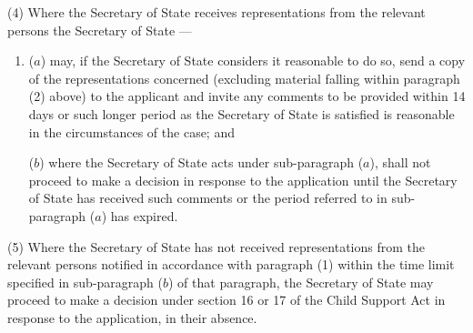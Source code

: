\documentclass[12pt,a4paper]{article}
\begin{document}
(4) Where the 
Secretary of State  %
receives representations from the relevant persons 
the Secretary of State%
—
\begin{enumerate}\item[]
($a$) may, if 
the Secretary of State  %
considers it reasonable to do so, send a copy of the representations concerned (excluding material falling within paragraph (2) above) to the applicant and invite any comments 
to be provided  %
within 14 days or such longer period as the 
Secretary of State  %
is satisfied is reasonable in the circumstances of the case; and

($b$) where the 
Secretary of State  %
acts under sub-paragraph ($a$), shall not proceed to make a decision in response to the application until 
the Secretary of State  %
has received such comments or the period referred to in sub-paragraph ($a$)  has expired.
\end{enumerate}

(5) Where the 
Secretary of State  %
has not received representations from the relevant persons notified in accordance with paragraph (1) within the time limit specified in sub-paragraph ($b$)  of that paragraph, 
the Secretary of State  %
may proceed to make a decision under section 16 or 17 of the Child Support Act in response to the application, in their absence.
\end{document}
